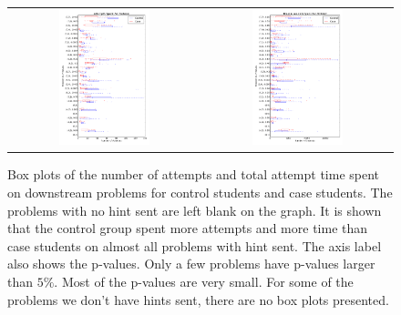 \documentclass{llncs2e/llncs}
\begin{document}
\begin{figure}[ht]
  \centering
  \begin{tabular}{c c}
  \includegraphics[width=0.5\textwidth]{image/problem_tries_downstream.png} & 
  \includegraphics[width=0.5\textwidth]{image/problem_time_downstream.png}
  \end{tabular}
  \caption{Box plots of the number of attempts and total attempt time spent on downstream problems for control students and case students. The problems with no hint sent are left blank on the graph. It is shown that the control group spent more attempts and more time than case students on almost all problems with hint sent. The axis label also shows the p-values. Only a few problems have p-values larger than $5\%$. Most of the p-values are very small. For some of the problems we don't have hints sent, there are no box plots presented.}
   \label{fig:prob_tries_analysis}
\end{figure}
\end{document}
